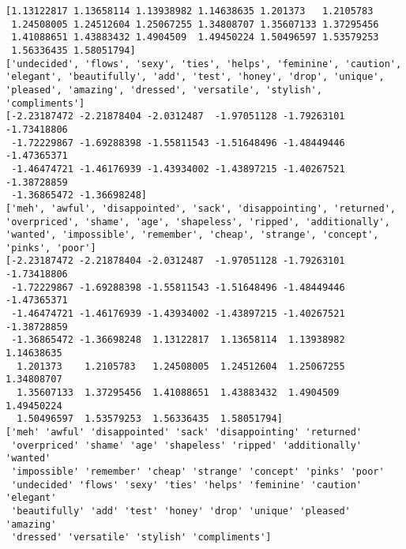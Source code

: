 \documentclass[11pt]{article}
\begin{document}
    \begin{Verbatim}[commandchars=\\\{\}]
[1.13122817 1.13658114 1.13938982 1.14638635 1.201373   1.2105783
 1.24508005 1.24512604 1.25067255 1.34808707 1.35607133 1.37295456
 1.41088651 1.43883432 1.4904509  1.49450224 1.50496597 1.53579253
 1.56336435 1.58051794]
['undecided', 'flows', 'sexy', 'ties', 'helps', 'feminine', 'caution', 'elegant', 'beautifully', 'add', 'test', 'honey', 'drop', 'unique', 'pleased', 'amazing', 'dressed', 'versatile', 'stylish', 'compliments']
[-2.23187472 -2.21878404 -2.0312487  -1.97051128 -1.79263101 -1.73418806
 -1.72229867 -1.69288398 -1.55811543 -1.51648496 -1.48449446 -1.47365371
 -1.46474721 -1.46176939 -1.43934002 -1.43897215 -1.40267521 -1.38728859
 -1.36865472 -1.36698248]
['meh', 'awful', 'disappointed', 'sack', 'disappointing', 'returned', 'overpriced', 'shame', 'age', 'shapeless', 'ripped', 'additionally', 'wanted', 'impossible', 'remember', 'cheap', 'strange', 'concept', 'pinks', 'poor']
[-2.23187472 -2.21878404 -2.0312487  -1.97051128 -1.79263101 -1.73418806
 -1.72229867 -1.69288398 -1.55811543 -1.51648496 -1.48449446 -1.47365371
 -1.46474721 -1.46176939 -1.43934002 -1.43897215 -1.40267521 -1.38728859
 -1.36865472 -1.36698248  1.13122817  1.13658114  1.13938982  1.14638635
  1.201373    1.2105783   1.24508005  1.24512604  1.25067255  1.34808707
  1.35607133  1.37295456  1.41088651  1.43883432  1.4904509   1.49450224
  1.50496597  1.53579253  1.56336435  1.58051794]
['meh' 'awful' 'disappointed' 'sack' 'disappointing' 'returned'
 'overpriced' 'shame' 'age' 'shapeless' 'ripped' 'additionally' 'wanted'
 'impossible' 'remember' 'cheap' 'strange' 'concept' 'pinks' 'poor'
 'undecided' 'flows' 'sexy' 'ties' 'helps' 'feminine' 'caution' 'elegant'
 'beautifully' 'add' 'test' 'honey' 'drop' 'unique' 'pleased' 'amazing'
 'dressed' 'versatile' 'stylish' 'compliments']

    \end{Verbatim}

    \begin{center}
    \end{center}
    { \hspace*{\fill} \\}
    
\end{document}
